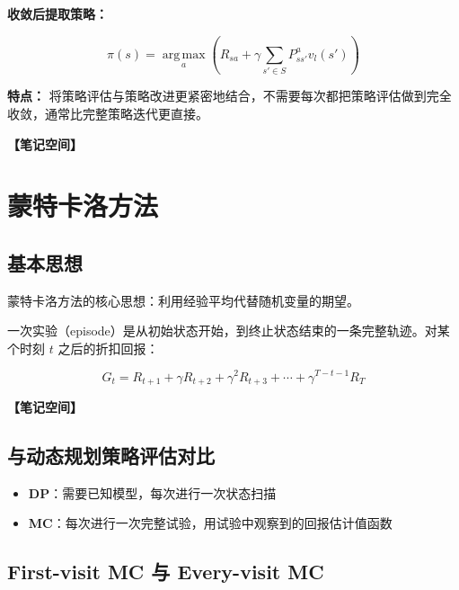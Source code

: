 \documentclass[12pt,a4paper]{article}
\newcommand{\notespace}[1][3cm]{%
  \vspace{#1}%
  \noindent\textbf{【笔记空间】}%
  \vspace{#1}%
}
\newcommand{\1}{\mathbf{1}}
\newcommand{\argmax}{\operatorname*{arg\,max}}
\begin{document}
\textbf{收敛后提取策略：}

\begin{equation}
\pi(s)=\argmax_a\left( R_{sa}+\gamma\sum_{s'\in S}P_{ss'}^a v_l(s') \right)
\end{equation}

\begin{summarybox}
\textbf{特点：} 将策略评估与策略改进更紧密地结合，不需要每次都把策略评估做到完全收敛，通常比完整策略迭代更直接。
\end{summarybox}

\notespace[3cm]

\newpage

\section{蒙特卡洛方法}

\subsection{基本思想}

\begin{keybox}
蒙特卡洛方法的核心思想：利用经验平均代替随机变量的期望。
\end{keybox}

一次实验（episode）是从初始状态开始，到终止状态结束的一条完整轨迹。对某个时刻 $t$ 之后的折扣回报：

\begin{equation}
G_t=R_{t+1}+\gamma R_{t+2}+\gamma^2 R_{t+3}+\cdots+\gamma^{T-t-1}R_T
\end{equation}

\notespace[2cm]

\subsection{与动态规划策略评估对比}

\begin{itemize}[leftmargin=2em]
  \item \textbf{DP}：需要已知模型，每次进行一次状态扫描
  \item \textbf{MC}：每次进行一次完整试验，用试验中观察到的回报估计值函数
\end{itemize}

\subsection{First-visit MC 与 Every-visit MC}
\end{document}

